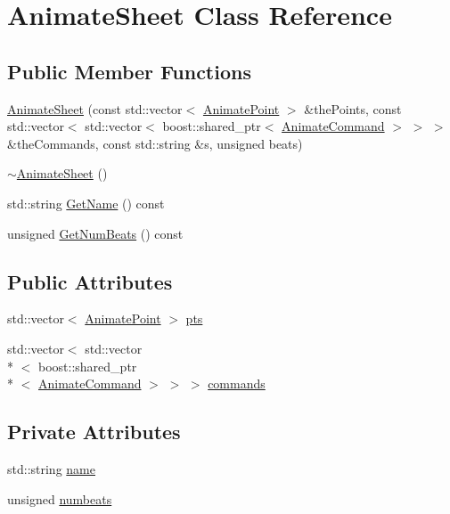 \hypertarget{a00008}{\section{Animate\-Sheet Class Reference}
\label{a00008}
}
\subsection*{Public Member Functions}
\begin{DoxyCompactItemize}
\item 
\hyperlink{a00008_aa721baf0040e2ee95d3912a2a3aa5016}{Animate\-Sheet} (const std\-::vector$<$ \hyperlink{a00196_a91212e6bb797b2b440819b6a9a86f702}{Animate\-Point} $>$ \&the\-Points, const std\-::vector$<$ std\-::vector$<$ boost\-::shared\-\_\-ptr$<$ \hyperlink{a00003}{Animate\-Command} $>$ $>$ $>$ \&the\-Commands, const std\-::string \&s, unsigned beats)
\item 
\hyperlink{a00008_a694e4257ad7d66dfc79fbd1f9761daed}{$\sim$\-Animate\-Sheet} ()
\item 
std\-::string \hyperlink{a00008_abc74cf6e670435edfe6fa8884724f4d4}{Get\-Name} () const 
\item 
unsigned \hyperlink{a00008_a178ec574603d24f2ea8ea77258d56a21}{Get\-Num\-Beats} () const 
\end{DoxyCompactItemize}
\subsection*{Public Attributes}
\begin{DoxyCompactItemize}
\item 
std\-::vector$<$ \hyperlink{a00196_a91212e6bb797b2b440819b6a9a86f702}{Animate\-Point} $>$ \hyperlink{a00008_ab4b7ddaeddbd8a2abce467ffbfef1cd8}{pts}
\item 
std\-::vector$<$ std\-::vector\\*
$<$ boost\-::shared\-\_\-ptr\\*
$<$ \hyperlink{a00003}{Animate\-Command} $>$ $>$ $>$ \hyperlink{a00008_a73fe68e5317b281633892b7d3adf8b99}{commands}
\end{DoxyCompactItemize}
\subsection*{Private Attributes}
\begin{DoxyCompactItemize}
\item 
std\-::string \hyperlink{a00008_a3d69624ad9735831c6e4d1fa30b5bc95}{name}
\item 
unsigned \hyperlink{a00008_a2660ce9be9f921619852a825c66fecb2}{numbeats}
\end{DoxyCompactItemize}


